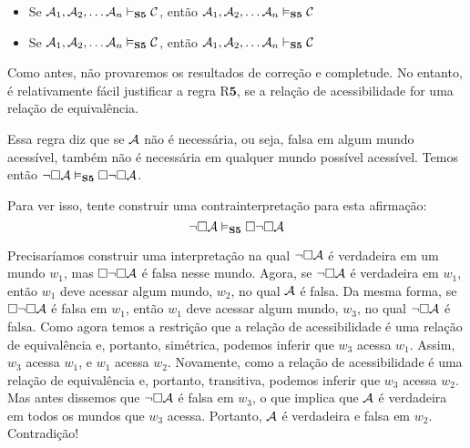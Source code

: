 \begin{itemize}
	\item Se $\mathcal{A}_1,\mathcal{A}_2, \dots \mathcal{A}_n\vdash_{\mathbf{S5}} \mathcal{C}$, então $\mathcal{A}_1,\mathcal{A}_2, \dots \mathcal{A}_n\vDash_{\mathbf{S5}} \mathcal{C}$
	\item Se $\mathcal{A}_1,\mathcal{A}_2, \dots \mathcal{A}_n\vDash_{\mathbf{S5}} \mathcal{C}$, então $\mathcal{A}_1,\mathcal{A}_2, \dots \mathcal{A}_n\vdash_{\mathbf{S5}} \mathcal{C}$
\end{itemize}
Como antes,  não  provaremos os resultados de correção e completude.  No entanto, é relativamente fácil  justificar  a regra R$\mathbf{5}$,  se a relação de acessibilidade for uma relação de equivalência.

Essa regra diz que se $\mathcal{A}$ não é necessária, ou seja, falsa em algum mundo acessível, também não é necessária em qualquer mundo possível acessível. Temos então $\neg\Box \mathcal{A} \vDash_{\mathbf{S5}}  \Box\neg\Box \mathcal{A}$.

Para ver isso, tente construir uma contrainterpretação para esta afirmação:
\[
	\neg\Box\mathcal{A} \vDash_{\mathbf{S5}}  \Box \neg\Box \mathcal{A}
\]
 
Precisaríamos construir uma interpretação  na qual  $\neg\Box\mathcal{A}$ é verdadeira em um mundo $w_1$, mas  $\Box \neg\Box \mathcal{A}$  é falsa nesse mundo.  Agora, se $\neg\Box\mathcal{A}$ é verdadeira em  $w_1$, então  $w_1$ deve acessar algum mundo, $w_2$, no qual $\mathcal{A}$ é falsa. Da mesma forma, se $\Box \neg\Box \mathcal{A}$ é falsa em  $w_1$, então  $w_1$ deve acessar algum mundo, $w_3$, no qual $\neg\Box \mathcal{A}$ é falsa. Como agora temos a restrição que a relação de acessibilidade é uma relação de equivalência e, portanto, simétrica, podemos inferir que $w_3$ acessa  $w_1$. Assim, $w_3$ acessa  $w_1$, e  $w_1$ acessa $w_2$. Novamente, como a relação de acessibilidade é uma relação de equivalência e, portanto, transitiva, podemos inferir que $w_3$ acessa $w_2$. Mas antes dissemos que $\neg\Box \mathcal{A}$ é falsa em $w_3$, o que implica que $\mathcal{A}$ é verdadeira em todos os mundos que $w_3$ acessa. Portanto, $\mathcal{A}$ é verdadeira e falsa em $w_2$. Contradição!


